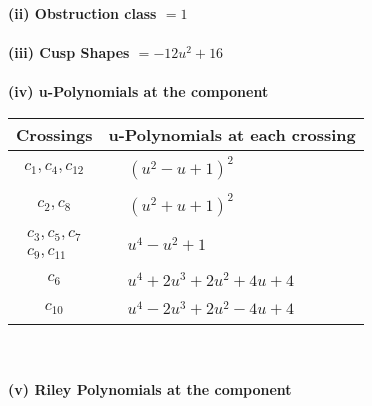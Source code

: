 \documentclass[1p]{elsarticle_modified}
\theoremstyle{definition}
\begin{document}
\flushleft \textbf{(ii) Obstruction class $= 1$}\\~\\
\flushleft \textbf{(iii) Cusp Shapes $= -12 u^2+16$}\\~\\
\newpage\renewcommand{\arraystretch}{1}
\flushleft \textbf{(iv) u-Polynomials at the component}\newline \\
\begin{tabular}{m{50pt}|m{274pt}}
Crossings & \hspace{64pt}u-Polynomials at each crossing \\
\hline $$\begin{aligned}c_{1},c_{4},c_{12}\end{aligned}$$&$\begin{aligned}
&(u^2- u+1)^2
\end{aligned}$\\
\hline $$\begin{aligned}c_{2},c_{8}\end{aligned}$$&$\begin{aligned}
&(u^2+u+1)^2
\end{aligned}$\\
\hline $$\begin{aligned}c_{3},c_{5},c_{7}\\c_{9},c_{11}\end{aligned}$$&$\begin{aligned}
&u^4- u^2+1
\end{aligned}$\\
\hline $$\begin{aligned}c_{6}\end{aligned}$$&$\begin{aligned}
&u^4+2 u^3+2 u^2+4 u+4
\end{aligned}$\\
\hline $$\begin{aligned}c_{10}\end{aligned}$$&$\begin{aligned}
&u^4-2 u^3+2 u^2-4 u+4
\end{aligned}$\\
\hline
\end{tabular}\\~\\
\newpage\renewcommand{\arraystretch}{1}
\flushleft \textbf{(v) Riley Polynomials at the component}\newline \\
\end{document}
